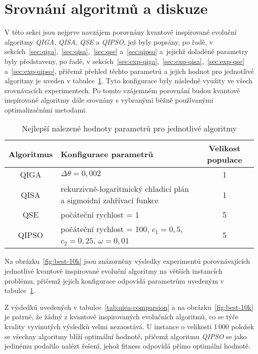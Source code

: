 \section{Srovnání algoritmů a diskuze}
V této sekci jsou nejprve navzájem porovnány kvantově inspirované evoluční algoritmy \emph{QIGA}, \emph{QISA}, \emph{QSE} a \emph{QIPSO}, jež byly popsány, po řadě, v sekcích~\ref{sec:qiga},~\ref{sec:qisa},~\ref{sec:qse} a~\ref{sec:qipso} a~jejichž doladěné parametry byly představeny, po řadě, v sekcích~\ref{sec:exp-qiga},~\ref{sec:exp-qisa},~\ref{sec:exp-qse} a~\ref{sec:exp-qipso}, přičemž přehled těchto parametrů a jejich hodnot pro jednotlivé algoritmy je uveden v tabulce~\ref{tab:best-configs}. 
Tyto konfigurace byly následně využity ve všech srovnávacích experimentech. 
Po tomto vzájemném porovnání budou kvantově inspirované algoritmy dále srovnány s vybranými běžně používanými optimalizačními metodami. 

\begin{table}[ht]
    \centering
    \begin{tabularx}{\textwidth}{c X c}
        \toprule
        \textbf{Algoritmus} & \textbf{Konfigurace parametrů} & \textbf{Velikost populace} \\
        \midrule
        QIGA   & $\Delta\theta = 0{,}002$ & 1 \\[1ex]
        QISA   & rekurzivně-logaritmický chladicí plán a sigmoidní zahřívací funkce & 1 \\[1ex]
        QSE    & počáteční rychlost = 1 & 5 \\[1ex]
        QIPSO  & počáteční rychlost = 100, $c_1 = 0{,}5$, $c_2 = 0{,}25$, $\omega = 0{,}01$ & 5 \\
        \bottomrule
    \end{tabularx}
    \caption{Nejlepší nalezené hodnoty parametrů pro jednotlivé algoritmy}
    \label{tab:best-configs}
\end{table}

Na obrázku~\ref{fig:best-10k} jsou znázorněny výsledky experimentů porovnávajících jednotlivé kvantově inspirované evoluční algoritmy na větších instancích problému, přičemž jejich konfigurace odpovídá parametrům uvedeným v tabulce~\ref{tab:best-configs}. 

Z výsledků uvedených v tabulce~\ref{tab:qiea-comparsion} a na obrázku~\ref{fig:best-10k} je patrné, že žádný z kvantově inspirovaných evolučních algoritmů, co se týče kvality vyvinutých výsledků velmi nezaostává. 
U instance o velikosti 1\,000 položek se všechny algoritmy blíží optimální hodnotě, přičemž algoritmu \emph{QIPSO} se jako jedinému podařilo nalézt řešení, jehož fitness odpovídá přímo optimální hodnotě. 

